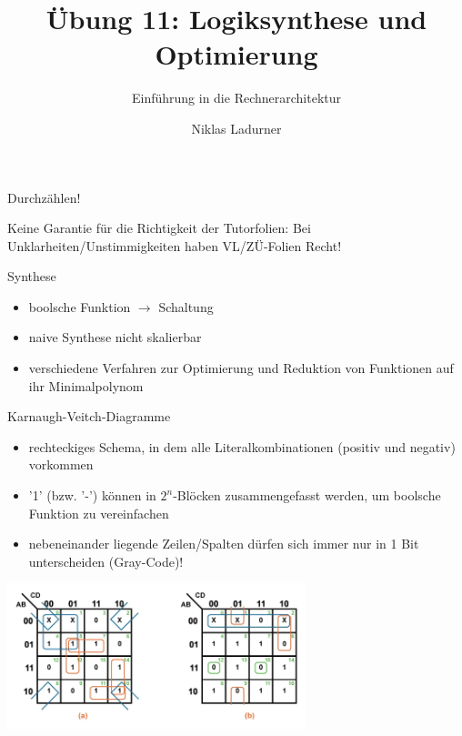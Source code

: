 \documentclass[
  german,            %
  aspectratio=169,    %
]{tumbeamer}
\title{Übung 11: Logiksynthese und\\Optimierung}
\subtitle{Einführung in die Rechnerarchitektur}
\author{Niklas Ladurner}
\institute{\theChairName\\\theDepartmentName\\\theUniversityName}
\date{\DTMdisplaydate{2024}{1}{12}{-1}}
\begin{document}
\maketitle

\begin{frame}[c]{}{}
  \begin{center}
    \LARGE  Durchzählen!
  \end{center}
\end{frame}

\begin{frame}[c]{}{}
  \begin{center}
    \LARGE  Keine Garantie für die Richtigkeit der Tutorfolien: Bei Unklarheiten/Unstimmigkeiten
    haben VL/ZÜ-Folien Recht!
  \end{center}
\end{frame}

\begin{frame}[fragile, c]{Synthese}{}
  \begin{itemize}
    \item boolsche Funktion $\rightarrow$ Schaltung
    \item naive Synthese nicht skalierbar
    \item verschiedene Verfahren zur Optimierung und Reduktion von Funktionen auf ihr Minimalpolynom
  \end{itemize}

\end{frame}

\begin{frame}[fragile, c]{Karnaugh-Veitch-Diagramme}{}
  \begin{itemize}
    \item rechteckiges Schema, in dem alle Literalkombinationen (positiv und negativ) vorkommen
    \item '1' (bzw. '-') können in $2^n$-Blöcken zusammengefasst werden, um boolsche Funktion zu vereinfachen
    \item nebeneinander liegende Zeilen/Spalten dürfen sich immer nur in 1 Bit unterscheiden (Gray-Code)!
  \end{itemize}
  \begin{center}
    \includegraphics[width=0.65\textwidth]{w11_kmap.png}
  \end{center}
\end{frame}
\end{document}
